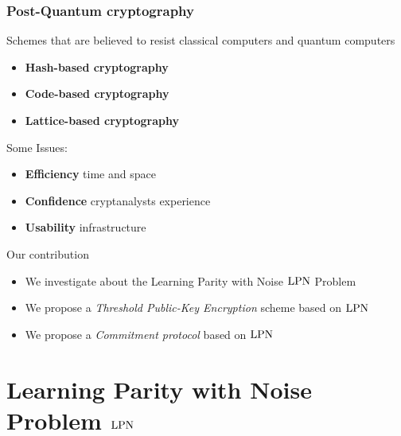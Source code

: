 \begin{frame}
\frametitle{Post-Quantum cryptography}
 Schemes that are believed to resist classical computers and quantum computers
      \begin{itemize}
      \item \textbf{Hash-based cryptography}
      \item \textbf{Code-based cryptography}
      \item \textbf{Lattice-based cryptography}
      \end{itemize}
 \begin{block}{Some Issues:}
  \begin{itemize}
 \item \textbf{Efficiency} time and space 
 \item \textbf{Confidence} cryptanalysts experience 
 \item \textbf{Usability} infrastructure
\end{itemize}
 \end{block}
\begin{block}{Our contribution}
 \begin{itemize}
  \item We investigate about the Learning Parity with Noise $\mathrm{LPN}$ Problem
  \item We propose a \emph{Threshold Public-Key Encryption} scheme based on $\mathrm{LPN}$
  \item We propose a \emph{Commitment protocol} based on $\mathrm{LPN}$
 \end{itemize}

\end{block}

\end{frame}


\section{Learning Parity with Noise Problem $\mathrm{LPN}$}

